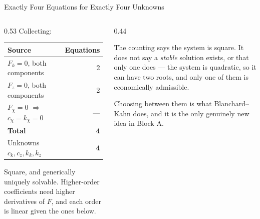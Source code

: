 \begin{frame}{Exactly Four Equations for Exactly Four Unknowns}
\begin{columns}[T]
\begin{column}{0.53\textwidth}
\small
Collecting:
\medskip
\begin{center}\footnotesize
\begin{tabularx}{\linewidth}{@{}>{\raggedright\arraybackslash}X r@{}}
\toprule
\textbf{Source} & \textbf{Equations} \\
\midrule
$F_k=0$, both components & 2 \\
$F_z=0$, both components & 2 \\
$F_\chi=0$ $\Rightarrow$ $c_\chi=k_\chi=0$ & --- \\
\midrule
\textbf{Total} & \textbf{4} \\
\midrule
Unknowns $c_k,c_z,k_k,k_z$ & \textbf{4} \\
\bottomrule
\end{tabularx}
\end{center}
\medskip
Square, and generically uniquely solvable. Higher-order coefficients need higher derivatives of $F$, and each order is linear given the ones below.
\end{column}
\begin{column}{0.44\textwidth}
\begin{cautionbox}[title=\textbf{``Generically''}]\small
The counting says the system is square. It does not say a \emph{stable} solution exists, or that only one does --- the system is quadratic, so it can have two roots, and only one of them is economically admissible.
\end{cautionbox}
\medskip
\begin{examplebox}\footnotesize
Choosing between them is what Blanchard--Kahn does, and it is the only genuinely new idea in Block A.
\end{examplebox}
\end{column}
\end{columns}
\vspace{1mm}
\end{frame}

